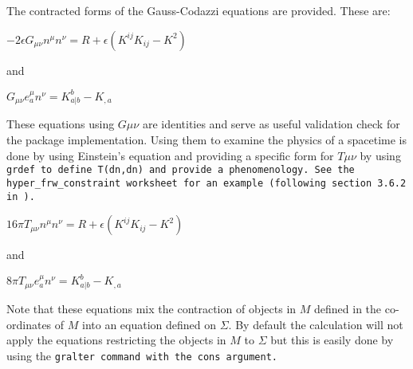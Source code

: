 \documentclass{article}
\begin{document}
The contracted forms of the Gauss-Codazzi equations are provided. These are:
\begin{center}
$-2 \epsilon G_{\mu \nu} n^\mu n^\nu = R + \epsilon \left( K^{i j}K_{ij} -K^2 \right)$ \\
\end{center}
and 
\begin{center}
$G_{\mu \nu} e^\mu_a n^\nu = K^b_{a|b} - K_{,a}$
\end{center}
These equations using $G{\mu \nu}$ are identities and serve as useful validation check for the package implementation. Using them to 
examine the physics of a spacetime is done by using Einstein's equation and providing a specific form for $T{\mu \nu}$
by using \text\tt{grdef} to define \text\tt{T(dn,dn)} and provide a phenomenology. See the \text\tt{hyper\_frw\_constraint} worksheet
for an example (following section 3.6.2 in \cite{poisson:2004}). 

\begin{center}
$16 \pi T_{\mu \nu} n^\mu n^\nu = R + \epsilon \left( K^{i j}K_{ij} -K^2 \right)$ \\
\end{center}
and 
\begin{center}
$8 \pi T_{\mu \nu} e^\mu_a n^\nu = K^b_{a|b} - K_{,a}$
\end{center}

Note that these equations mix the contraction of objects in $M$ defined in the co-ordinates of $M$ into an equation 
defined on $\Sigma$. By default the 
calculation will not apply the equations restricting the objects in $M$ to $\Sigma$ but this is easily done by using the
\text\tt{gralter} command with the \text\tt{cons} argument. \\
\end{document}
